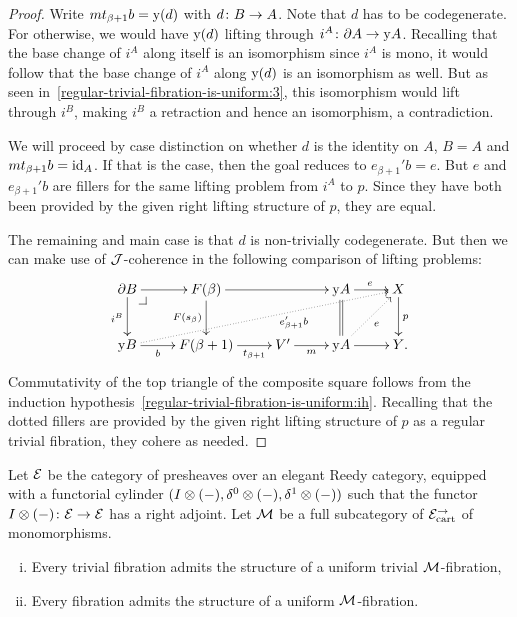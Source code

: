 \documentclass[reqno,10pt,a4paper,oneside,draft]{amsart}
\begin{document}
\begin{proof}
Write $m t_{\beta+1} b = \yon(d)$ with $d \co B \to A$.
Note that $d$ has to be codegenerate.
For otherwise, we would have $\yon(d)$ lifting through $i^A \co \partial A \to \yon A$.
Recalling that the base change of $i^A$ along itself is an isomorphism since $i^A$ is mono, it would follow that the base change of $i^A$ along $\yon(d)$ is an isomorphism as well.
But as seen in~\eqref{regular-trivial-fibration-is-uniform:3}, this isomorphism would lift through $i^B$, making $i^B$ a retraction and hence an isomorphism, a contradiction.

We will proceed by case distinction on whether $d$ is the identity on $A$, \ie $B = A$ and $m t_{\beta+1} b = \id_A$.
If that is the case, then the goal reduces to $e_{\beta+1}' b = e$.
But $e$ and $e_{\beta+1}' b$ are fillers for the same lifting problem from $i^A$ to $p$.
Since they have both been provided by the given right lifting structure of $p$, they are equal.

The remaining and main case is that $d$ is non-trivially codegenerate.
But then we can make use of $\cal{J}$-coherence in the following comparison of lifting problems:
\[
\xymatrix{
  \partial B
  \ar[r]
  \ar[d]_{i^B}
  \pullback{dr}
&
  F(\beta)
  \ar[rr]
  \ar[d]_{F(s_{\beta})}
&&
  \yon A
  \ar[r]^{e}
  \ar@{=}[d]
&
  X
  \ar[d]^{p}
\\
  \yon B
  \ar[r]_-{b}
  \ar@{.>}[urrrr]_(0.6){e_{\beta+1}' b}
&
  F(\beta+1)
  \ar[r]_-{t_{\beta+1}}
&
  V'
  \ar[r]_-{m}
&
  \yon A
  \ar[r]
  \ar@{.>}[ur]_{e}
&
  Y
\rlap{.}}
\]
Commutativity of the top triangle of the composite square follows from the induction hypothesis~\eqref{regular-trivial-fibration-is-uniform:ih}.
Recalling that the dotted fillers are provided by the given right lifting structure of $p$ as a regular trivial fibration, they cohere as needed.
\end{proof}

\begin{theorem} \label{thm:ac-kan-is-uniform}
Let $\catE$ be the category of presheaves over an elegant Reedy category, equipped with a functorial cylinder $(\interval \otimes (-), \lcyl \otimes (-), \rcyl \otimes(-))$ such that the functor $\interval \otimes (-) \co \catE \to \catE$ has a right adjoint.
Let $\cal{M}$ be a full subcategory of $\cal{E}_{\cart}^\to$ of monomorphisms.
\begin{enumerate}[(i)]
\item Every trivial fibration admits the structure of a uniform trivial $\cal{M}$-fibration,
\item Every fibration admits the structure of a uniform $\cal{M}$-fibration.
\end{enumerate}
\end{theorem}
\end{document}
